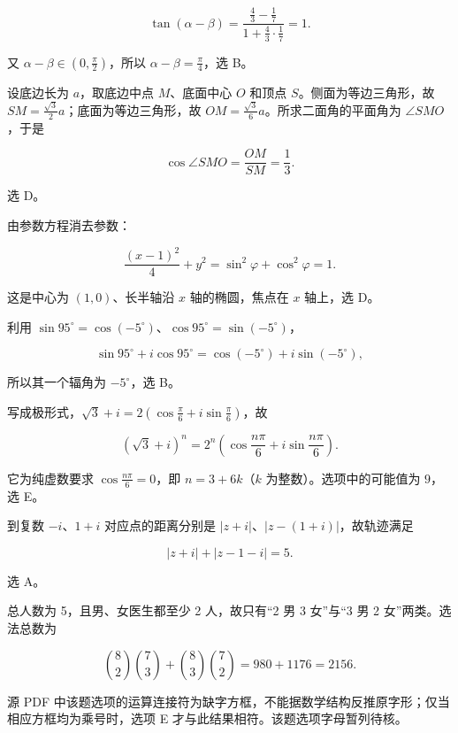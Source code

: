 \begin{answer}
\nopagebreak[4]
\[
\tan(\alpha-\beta)
=\frac{\frac43-\frac17}{1+\frac43\cdot\frac17}=1.
\]

又 $\alpha-\beta\in(0,\frac\pi2)$，所以 $\alpha-\beta=\frac\pi4$，选 B。


设底边长为 $a$，取底边中点 $M$、底面中心 $O$ 和顶点 $S$。侧面为等边三角形，故 $SM=\frac{\sqrt3}{2}a$；底面为等边三角形，故 $OM=\frac{\sqrt3}{6}a$。所求二面角的平面角为 $\angle SMO$，于是

\nopagebreak[4]
\[
\cos\angle SMO=\frac{OM}{SM}=\frac13.
\]

选 D。


由参数方程消去参数：

\nopagebreak[4]
\[
\frac{(x-1)^2}{4}+y^2=\sin^2\varphi+\cos^2\varphi=1.
\]

这是中心为 $(1,0)$、长半轴沿 $x$ 轴的椭圆，焦点在 $x$ 轴上，选 D。


利用 $\sin95^\circ=\cos(-5^\circ)$、$\cos95^\circ=\sin(-5^\circ)$，

\nopagebreak[4]
\[
\sin95^\circ+i\cos95^\circ
=\cos(-5^\circ)+i\sin(-5^\circ),
\]

所以其一个辐角为 $-5^\circ$，选 B。


写成极形式，$\sqrt3+i=2(\cos\frac\pi6+i\sin\frac\pi6)$，故

\nopagebreak[4]
\[
(\sqrt3+i)^n=2^n\left(\cos\frac{n\pi}{6}+i\sin\frac{n\pi}{6}\right).
\]

它为纯虚数要求 $\cos\frac{n\pi}{6}=0$，即 $n=3+6k$（$k$ 为整数）。选项中的可能值为 $9$，选 E。


到复数 $-i$、$1+i$ 对应点的距离分别是 $|z+i|$、$|z-(1+i)|$，故轨迹满足

\nopagebreak[4]
\[
|z+i|+|z-1-i|=5.
\]

选 A。


总人数为 5，且男、女医生都至少 2 人，故只有“2 男 3 女”与“3 男 2 女”两类。选法总数为

\nopagebreak[4]
\[
\binom82\binom73+\binom83\binom72
=980+1176=2156.
\]

源 PDF 中该题选项的运算连接符为缺字方框，不能据数学结构反推原字形；仅当相应方框均为乘号时，选项 E 才与此结果相符。该题选项字母暂列待核。


\end{answer}
